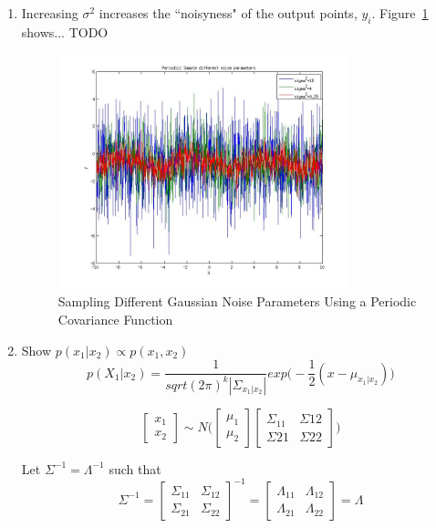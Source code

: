 \documentclass{article}
\begin{document}
\begin{enumerate}[label=(\alph*)]
\item Increasing $\sigma^2$ increases the ``noisyness" of the output points, $y_i$.
Figure~\ref{fig:1b} shows... TODO

\begin{figure}[H]
\centering
\includegraphics[width=0.8\textwidth]{1_b.jpg}
\caption{Sampling Different Gaussian Noise Parameters Using a Periodic Covariance Function}
\label{fig:1b}
\end{figure}

\item Show $p(x_1|x_2)\propto{}p(x_1,x_2)$ \\

\begin{equation*}
p(X_1|x_2)=\frac{1}{sqrt{(2\pi)^k}|\Sigma_{x_1|x_2}|}exp\Big(-\frac{1}{2}(x-\mu_{x_1|x_2})\Big)
\end{equation*}

\[
\begin{bmatrix}
  x_1 \\ x_2
\end{bmatrix}
\sim{}N \Bigg(
\begin{bmatrix}
  \mu_1 \\ \mu_2
\end{bmatrix}
\begin{bmatrix}
  \Sigma_{11} & \Sigma{12} \\ \Sigma{21} & \Sigma{22}
\end{bmatrix}
\Bigg)
\]

Let $\Sigma^{-1}=\Lambda^{-1}$ such that
\[
\Sigma^{-1}=
\begin{bmatrix}
  \Sigma_{11} & \Sigma_{12} \\ \Sigma_{21} & \Sigma_{22}
\end{bmatrix}
^{-1}=
\begin{bmatrix}
  \Lambda_{11} & \Lambda_{12} \\ \Lambda_{21} & \Lambda_{22}
\end{bmatrix}
=\Lambda
\]


\end{enumerate}
\end{document}
